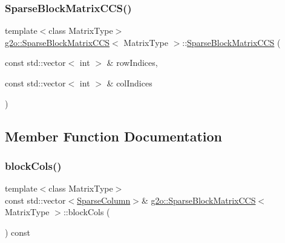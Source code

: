 \subsubsection{\texorpdfstring{Sparse\+Block\+Matrix\+C\+C\+S()}{SparseBlockMatrixCCS()}}
{\footnotesize\ttfamily template$<$class Matrix\+Type$>$ \\
\mbox{\hyperlink{classg2o_1_1_sparse_block_matrix_c_c_s}{g2o\+::\+Sparse\+Block\+Matrix\+C\+CS}}$<$ Matrix\+Type $>$\+::\mbox{\hyperlink{classg2o_1_1_sparse_block_matrix_c_c_s}{Sparse\+Block\+Matrix\+C\+CS}} (\begin{DoxyParamCaption}\item[{const std\+::vector$<$ int $>$ \&}]{row\+Indices,  }\item[{const std\+::vector$<$ int $>$ \&}]{col\+Indices }\end{DoxyParamCaption})\hspace{0.3cm}{\ttfamily [inline]}}



\subsection{Member Function Documentation}
\mbox{\label{classg2o_1_1_sparse_block_matrix_c_c_s_a30586863195a37c6ac87d7fb17376ee7}} 
\subsubsection{\texorpdfstring{block\+Cols()}{blockCols()}\hspace{0.1cm}{\footnotesize\ttfamily [1/2]}}
{\footnotesize\ttfamily template$<$class Matrix\+Type$>$ \\
const std\+::vector$<$\mbox{\hyperlink{classg2o_1_1_sparse_block_matrix_c_c_s_a4fc5dfe0a9ff9bd62065ca4b17f25bc1}{Sparse\+Column}}$>$\& \mbox{\hyperlink{classg2o_1_1_sparse_block_matrix_c_c_s}{g2o\+::\+Sparse\+Block\+Matrix\+C\+CS}}$<$ Matrix\+Type $>$\+::block\+Cols (\begin{DoxyParamCaption}{ }\end{DoxyParamCaption}) const\hspace{0.3cm}{\ttfamily [inline]}}



